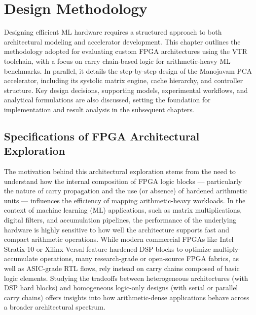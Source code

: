 \chapter{Design Methodology}

Designing efficient ML hardware requires a structured approach to both architectural modeling and accelerator development. This chapter outlines the methodology adopted for evaluating custom FPGA architectures using the VTR toolchain, with a focus on carry chain-based logic for arithmetic-heavy ML benchmarks. In parallel, it details the step-by-step design of the Manojavam PCA accelerator, including its systolic matrix engine, cache hierarchy, and controller structure. Key design decisions, supporting models, experimental workflows, and analytical formulations are also discussed, setting the foundation for implementation and result analysis in the subsequent chapters.

\section{Specifications of FPGA Architectural Exploration}
The motivation behind this architectural exploration stems from the need to understand how the internal composition of FPGA logic blocks — particularly the nature of carry propagation and the use (or absence) of hardened arithmetic units — influences the efficiency of mapping arithmetic-heavy workloads. In the context of machine learning (ML) applications, such as matrix multiplications, digital filters, and accumulation pipelines, the performance of the underlying hardware is highly sensitive to how well the architecture supports fast and compact arithmetic operations. While modern commercial FPGAs like Intel Stratix-10 or Xilinx Versal feature hardened DSP blocks to optimize multiply-accumulate operations, many research-grade or open-source FPGA fabrics, as well as ASIC-grade RTL flows, rely instead on carry chains composed of basic logic elements. Studying the tradeoffs between heterogeneous architectures (with DSP hard blocks) and homogeneous logic-only designs (with serial or parallel carry chains) offers insights into how arithmetic-dense applications behave across a broader architectural spectrum.

